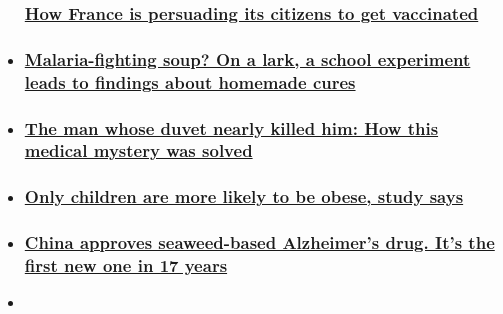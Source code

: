 \begin{itemize}
{  \subsubsection{\texorpdfstring{\href{/2019/07/03/health/france-fighting-vaccine-skepticism-partner-intl/index.html}{How
  France is persuading its citizens to get
  vaccinated}}{How France is persuading its citizens to get vaccinated}}\label{how-france-is-persuading-its-citizens-to-get-vaccinated}}
\item
  \hypertarget{malaria-fighting-soup-on-a-lark-a-school-experiment-leads-to-findings-about-homemade-cures}{%
  \subsubsection{\texorpdfstring{\href{/2019/11/18/health/malaria-fighting-soup-wellness/index.html}{Malaria-fighting
  soup? On a lark, a school experiment leads to findings about homemade
  cures}}{Malaria-fighting soup? On a lark, a school experiment leads to findings about homemade cures}}\label{malaria-fighting-soup-on-a-lark-a-school-experiment-leads-to-findings-about-homemade-cures}}
\item
  \hypertarget{the-man-whose-duvet-nearly-killed-him-how-this-medical-mystery-was-solved-}{%
  \subsubsection{\texorpdfstring{\href{/2019/11/18/health/feather-down-duvet-sickness-wellness/index.html}{The
  man whose duvet nearly killed him: How this medical mystery was solved
  }}{The man whose duvet nearly killed him: How this medical mystery was solved }}\label{the-man-whose-duvet-nearly-killed-him-how-this-medical-mystery-was-solved-}}
\item
  \hypertarget{only-children-are-more-likely-to-be-obese-study-says}{%
  \subsubsection{\texorpdfstring{\href{/2019/11/06/health/only-child-obesity-connection-wellness/index.html}{Only
  children are more likely to be obese, study
  says}}{Only children are more likely to be obese, study says}}\label{only-children-are-more-likely-to-be-obese-study-says}}
\item
  \hypertarget{china-approves-seaweed-based-alzheimers-drug-its-the-first-new-one-in-17-years}{%
  \subsubsection{\texorpdfstring{\href{/2019/11/03/health/china-alzheimers-drug-intl-hnk-scli/index.html}{China
  approves seaweed-based Alzheimer's drug. It's the first new one in 17
  years}}{China approves seaweed-based Alzheimer's drug. It's the first new one in 17 years}}\label{china-approves-seaweed-based-alzheimers-drug-its-the-first-new-one-in-17-years}}
\item
  \hypertarget{meet-belfasts-dementia-friendly-barber-}{%
}
\end{itemize}
